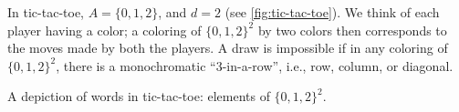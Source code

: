 In tic-tac-toe, $A = \{0,1,2\}$, and $d=2$ (see \cref{fig:tic-tac-toe}). We think of each player having a color; a coloring of $\{0,1,2\}^2$ by two colors then corresponds to the moves made by both the players. A draw is impossible if  in any coloring of $\{0,1,2\}^2$, there is a monochromatic ``3-in-a-row'', i.e.,  row, column, or diagonal.
\begin{marginfigure}
\begin{center}
\end{center}
\caption{A depiction of  words in tic-tac-toe: elements of $\{0,1,2\}^2$.} \label{fig:tic-tac-toe}
\end{marginfigure}
